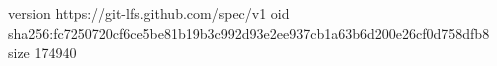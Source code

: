 version https://git-lfs.github.com/spec/v1
oid sha256:fc7250720cf6ce5be81b19b3c992d93e2ee937cb1a63b6d200e26cf0d758dfb8
size 174940
